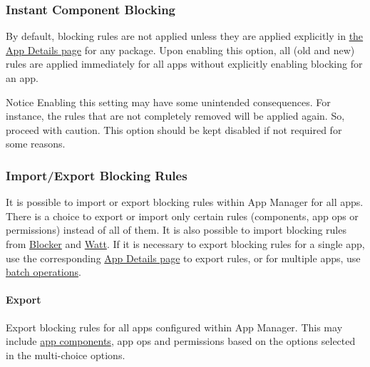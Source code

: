 \subsubsection{Instant Component Blocking}\label{subsubsec:instant-component-blocking} %
By default, blocking rules are not applied unless they are applied explicitly in \hyperref[sec:app-details-page]{the App
Details page} for any package.
Upon enabling this option, all (old and new) rules are applied immediately for all apps without explicitly enabling
blocking for an app.

\begin{warning}{Notice}
    Enabling this setting may have some unintended consequences.
    For instance, the rules that are not completely removed will be applied again.
    So, proceed with caution.
    This option should be kept disabled if not required for some reasons.
\end{warning}


\subsubsection{Import/Export Blocking Rules} %
It is possible to import or export blocking rules within App Manager for all apps.
There is a choice to export or import only certain rules (components, app ops or permissions) instead of all of them.
It is also possible to import blocking rules from \href{https://github.com/lihenggui/blocker}{Blocker} and
\href{https://github.com/tuyafeng/Watt}{Watt}.
If it is necessary to export blocking rules for a single app, use the corresponding \hyperref[sec:app-details-page]{App
Details page} to export rules, or for multiple apps, use \hyperref[subsec:batch-operations]{batch operations}.


\paragraph{Export} Export blocking rules for all apps configured within App Manager.
This may include \hyperref[subsec:faq:what-are-app-components]{app components}, app ops and permissions based on the
options selected in the multi-choice options.

